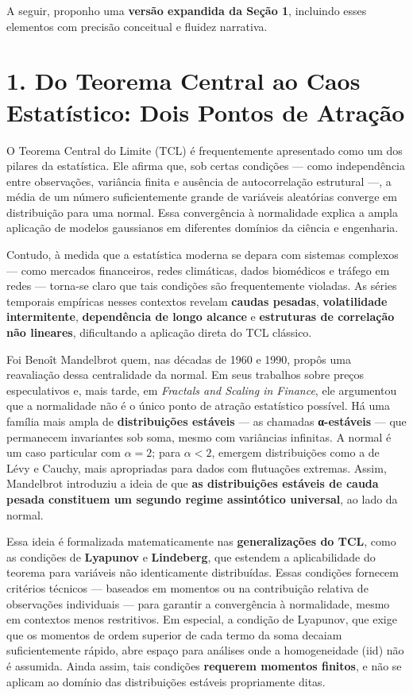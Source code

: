 \documentclass[
  portuguese,
]{agujournal2019}
\begin{document}
A seguir, proponho uma \textbf{versão expandida da Seção 1}, incluindo
esses elementos com precisão conceitual e fluidez narrativa.

\section{1. Do Teorema Central ao Caos Estatístico: Dois Pontos de
Atração}\label{do-teorema-central-ao-caos-estatuxedstico-dois-pontos-de-atrauxe7uxe3o}

O Teorema Central do Limite (TCL) é frequentemente apresentado como um
dos pilares da estatística. Ele afirma que, sob certas condições ---
como independência entre observações, variância finita e ausência de
autocorrelação estrutural ---, a média de um número suficientemente
grande de variáveis aleatórias converge em distribuição para uma normal.
Essa convergência à normalidade explica a ampla aplicação de modelos
gaussianos em diferentes domínios da ciência e engenharia.

Contudo, à medida que a estatística moderna se depara com sistemas
complexos --- como mercados financeiros, redes climáticas, dados
biomédicos e tráfego em redes --- torna-se claro que tais condições são
frequentemente violadas. As séries temporais empíricas nesses contextos
revelam \textbf{caudas pesadas}, \textbf{volatilidade intermitente},
\textbf{dependência de longo alcance} e \textbf{estruturas de correlação
não lineares}, dificultando a aplicação direta do TCL clássico.

Foi Benoît Mandelbrot quem, nas décadas de 1960 e 1990, propôs uma
reavaliação dessa centralidade da normal. Em seus trabalhos sobre preços
especulativos e, mais tarde, em \emph{Fractals and Scaling in Finance},
ele argumentou que a normalidade não é o único ponto de atração
estatístico possível. Há uma família mais ampla de \textbf{distribuições
estáveis} --- as chamadas \textbf{α-estáveis} --- que permanecem
invariantes sob soma, mesmo com variâncias infinitas. A normal é um caso
particular com \(\alpha = 2\); para \(\alpha < 2\), emergem
distribuições como a de Lévy e Cauchy, mais apropriadas para dados com
flutuações extremas. Assim, Mandelbrot introduziu a ideia de que
\textbf{as distribuições estáveis de cauda pesada constituem um segundo
regime assintótico universal}, ao lado da normal.

Essa ideia é formalizada matematicamente nas \textbf{generalizações do
TCL}, como as condições de \textbf{Lyapunov} e \textbf{Lindeberg}, que
estendem a aplicabilidade do teorema para variáveis não identicamente
distribuídas. Essas condições fornecem critérios técnicos --- baseados
em momentos ou na contribuição relativa de observações individuais ---
para garantir a convergência à normalidade, mesmo em contextos menos
restritivos. Em especial, a condição de Lyapunov, que exige que os
momentos de ordem superior de cada termo da soma decaiam suficientemente
rápido, abre espaço para análises onde a homogeneidade (iid) não é
assumida. Ainda assim, tais condições \textbf{requerem momentos
finitos}, e não se aplicam ao domínio das distribuições estáveis
propriamente ditas.
\end{document}
